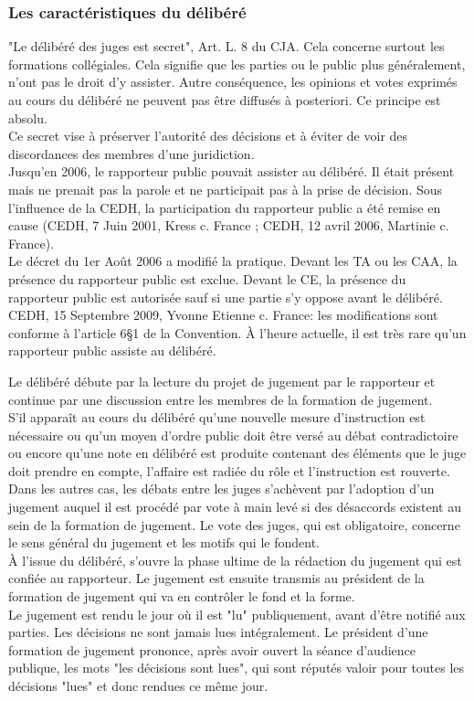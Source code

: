 \documentclass[10pt, a4paper, openany]{book}
\begin{document}
\subsubsection{Les caractéristiques du délibéré}

"Le délibéré des juges est secret", Art. L. 8 du CJA. Cela concerne surtout les formations collégiales. Cela signifie que les parties ou le public plus généralement, n'ont pas le droit d'y assister. Autre conséquence, les opinions et votes exprimés au cours du délibéré ne peuvent pas être diffusés à posteriori. Ce principe est absolu. \\
Ce secret vise à préserver l'autorité des décisions et à éviter de voir des discordances des membres d'une juridiction. \\
Jusqu'en 2006, le rapporteur public pouvait assister au délibéré. Il était présent mais ne prenait pas la parole et ne participait pas à la prise de décision. Sous l'influence de la CEDH, la participation du rapporteur public a été remise en cause (CEDH, 7 Juin 2001, Kress c. France ; CEDH, 12 avril 2006, Martinie c. France). \\
Le décret du 1er Août 2006 a modifié la pratique. Devant les TA ou les CAA, la présence du rapporteur public est exclue. Devant le CE, la présence du rapporteur public est autorisée sauf si une partie s'y oppose avant le délibéré. CEDH, 15 Septembre 2009, Yvonne Etienne c. France: les modifications sont conforme à l'article 6§1 de la Convention. À l'heure actuelle, il est très rare qu'un rapporteur public assiste au délibéré. 


Le délibéré débute par la lecture du projet de jugement par le rapporteur et continue par une discussion entre les membres de la formation de jugement. \\
S'il apparaît au cours du délibéré qu'une nouvelle mesure d'instruction est nécessaire ou qu'un moyen d'ordre public doit être versé au débat contradictoire ou encore qu'une note en délibéré est produite contenant des éléments que le juge doit prendre en compte, l'affaire est radiée du rôle et l'instruction est rouverte. \\
Dans les autres cas, les débats entre les juges s'achèvent par l'adoption d'un jugement auquel il est procédé par vote à main levé si des désaccords existent au sein de la formation de jugement. Le vote des juges, qui est obligatoire, concerne le sens général du jugement et les motifs qui le fondent. \\
À l'issue du délibéré, s'ouvre la phase ultime de la rédaction du jugement qui est confiée au rapporteur. Le jugement est ensuite transmis au président de la formation de jugement qui va en contrôler le fond et la forme. \\
Le jugement est rendu le jour où il est "lu" publiquement, avant d'être notifié aux parties. Les décisions ne sont jamais lues intégralement. Le président d'une formation de jugement prononce, après avoir ouvert la séance d'audience publique, les mots "les décisions sont lues", qui sont réputés valoir pour toutes les décisions "lues" et donc rendues ce même jour. 
\end{document}
